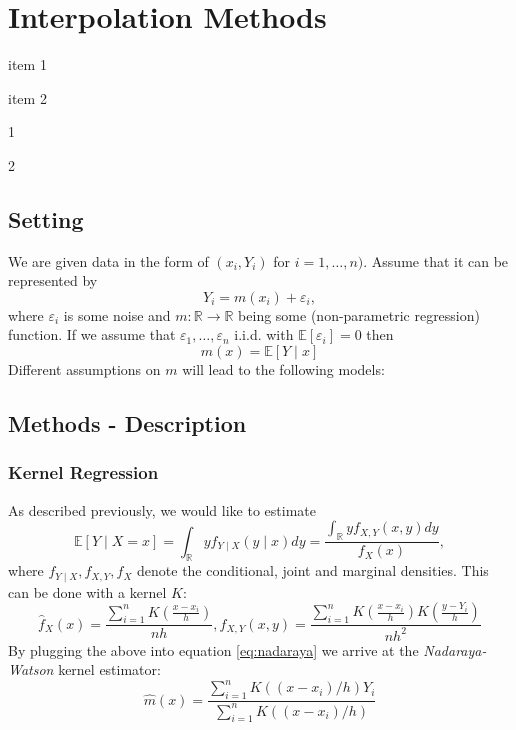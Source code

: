 \chapter{Interpolation Methods}

\begin{my_pros_cons_table}{
        \item item 1
        \item item 2
    }{
        \item 1
        \item 2
    }
\end{my_pros_cons_table}

\section{Setting}

We are given data in the form of $\left(x_{i}, Y_{i}\right)$ for $i=1, \ldots, n)$. Assume that it can be represented by
$$
    Y_{i}=m\left(x_{i}\right)+\varepsilon_{i},
$$
where $\varepsilon_i$ is some noise and $m: \mathbb{R} \rightarrow \mathbb{R}$ being some (non-parametric regression) function. If we assume that $\varepsilon_{1}, \ldots, \varepsilon_{n}$ i.i.d. with $\mathbb{E}\left[\varepsilon_{i}\right]=0$ then $$m(x)=\mathbb{E}[Y \mid x]$$
Different assumptions on $m$ will lead to the following models:



\section{Methods - Description}

\subsection{Kernel Regression}
\label{sec:Kernel}
As described previously, we would like to estimate
\begin{equation}
    \label{eq:nadaraya}
    \mathbb{E}[Y \mid X=x]
    = \int_{\mathbb{R}} y f_{Y \mid X}(y \mid x) d y
    =\frac{\int_{\mathbb{R}} y f_{X, Y}(x, y) d y}{f_{X}(x)},
\end{equation}
where $f_{Y \mid X}, f_{X, Y}, f_{X}$ denote the conditional, joint and marginal densities.
This can be done with a kernel $K$:
$$
    \hat{f}_{X}(x)=\frac{\sum_{i=1}^{n} K\left(\frac{x-x_{i}}{h}\right)}{n h}, \hat{f}_{X, Y}(x, y)=\frac{\sum_{i=1}^{n} K\left(\frac{x-x_{i}}{h}\right) K\left(\frac{y-Y_{i}}{h}\right)}{n h^{2}}
$$
By plugging the above into equation \ref{eq:nadaraya} we arrive at the \textit{Nadaraya-Watson} kernel estimator:
$$\hat{m}(x)=\frac{\sum_{i=1}^{n} K\left(\left(x-x_{i}\right) / h\right) Y_{i}}{\sum_{i=1}^{n} K\left(\left(x-x_{i}\right) / h\right)}$$

